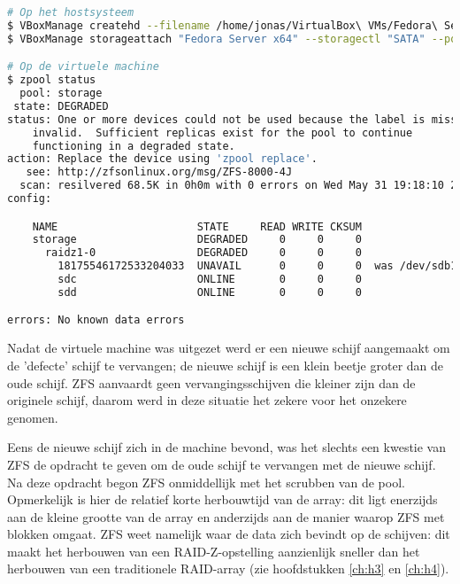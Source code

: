 \begin{lstlisting}[language=bash,style=command_style]
# Op het hostsysteem
$ VBoxManage createhd --filename /home/jonas/VirtualBox\ VMs/Fedora\ Server\ x64/TestZFS.vdi --size 42000 --format VDI --variant Fixed
$ VBoxManage storageattach "Fedora Server x64" --storagectl "SATA" --port 1 --device 0 --type HDD --medium /home/jonas/VirtualBox\ VMs/Fedora\ Server\ x64/TestZFS.vdi --mtype shareable

# Op de virtuele machine
$ zpool status
  pool: storage
 state: DEGRADED
status: One or more devices could not be used because the label is missing or
	invalid.  Sufficient replicas exist for the pool to continue
	functioning in a degraded state.
action: Replace the device using 'zpool replace'.
   see: http://zfsonlinux.org/msg/ZFS-8000-4J
  scan: resilvered 68.5K in 0h0m with 0 errors on Wed May 31 19:18:10 2017
config:

	NAME                      STATE     READ WRITE CKSUM
	storage                   DEGRADED     0     0     0
	  raidz1-0                DEGRADED     0     0     0
	    18175546172533204033  UNAVAIL      0     0     0  was /dev/sdb1
	    sdc                   ONLINE       0     0     0
	    sdd                   ONLINE       0     0     0

errors: No known data errors
\end{lstlisting}

Nadat de virtuele machine was uitgezet werd er een nieuwe schijf aangemaakt om de 'defecte' schijf te vervangen; de nieuwe schijf is een klein beetje groter dan de oude schijf. ZFS aanvaardt geen vervangingsschijven die kleiner zijn dan de originele schijf, daarom werd in deze situatie het zekere voor het onzekere genomen. 

Eens de nieuwe schijf zich in de machine bevond, was het slechts een kwestie van ZFS de opdracht te geven om de oude schijf te vervangen met de nieuwe schijf. Na deze opdracht begon ZFS onmiddellijk met het scrubben van de pool. Opmerkelijk is hier de relatief korte herbouwtijd van de array: dit ligt enerzijds aan de kleine grootte van de array en anderzijds aan de manier waarop ZFS met blokken omgaat. ZFS weet namelijk waar de data zich bevindt op de schijven: dit maakt het herbouwen van een RAID-Z-opstelling aanzienlijk sneller dan het herbouwen van een traditionele RAID-array (zie hoofdstukken \ref{ch:h3} en \ref{ch:h4}).

